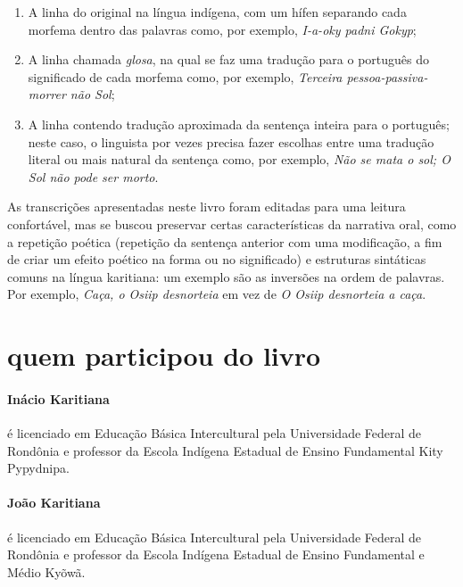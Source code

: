 \begin{enumerate}
\item A linha do original na língua indígena, com um hífen separando cada morfema dentro das palavras como, por exemplo, \textit{I-a-oky padni Gokyp};
\item A linha chamada \textit{glosa}, na qual se faz uma tradução para o português do significado de cada morfema como, por exemplo, \textit{Terceira pessoa-passiva-morrer não Sol};
\item A linha contendo tradução aproximada da sentença inteira para o português; neste caso, o linguista por vezes precisa fazer escolhas entre uma tradução literal ou mais natural da sentença como, por exemplo, \textit{Não se mata o sol; O Sol não pode ser morto}. 
\end{enumerate}

As transcrições apresentadas neste livro foram editadas para uma leitura confortável, mas se buscou preservar certas características da narrativa oral, como a repetição poética (repetição da sentença anterior com uma modificação, a fim de criar um efeito poético na forma ou no significado) e estruturas sintáticas comuns na língua karitiana: um exemplo são as inversões na ordem de palavras. Por exemplo, \textit{Caça, o Osiip desnorteia} em vez de \textit{O Osiip desnorteia a caça}.

\section{quem participou do livro\protect\footnotemark}

\paragraph{Inácio Karitiana} é licenciado em Educação Básica Intercultural pela Universidade Federal de Rondônia e professor da Escola Indígena Estadual de Ensino Fundamental Kity Pypydnipa.
\vspace{-0.2cm}

\paragraph{João Karitiana} é licenciado em Educação Básica Intercultural pela Universidade Federal de Rondônia e professor da Escola Indígena Estadual de Ensino Fundamental e Médio Kyõwã.
\vspace{-0.2cm}

